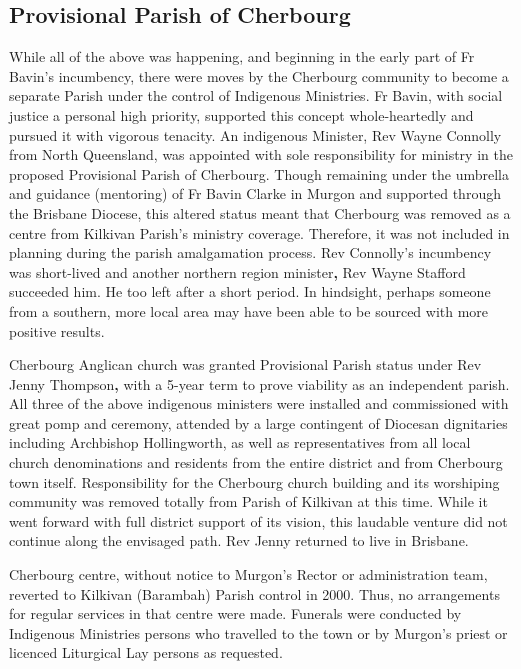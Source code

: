 \hypertarget{provisional-parish-of-cherbourg}{%
\subsection{Provisional Parish of Cherbourg}\label{provisional-parish-of-cherbourg}}

While all of the above was happening, and beginning in the early part of Fr Bavin's incumbency, there were moves by the Cherbourg community to become a separate Parish under the control of Indigenous Ministries. Fr Bavin, with social justice a personal high priority, supported this concept whole-heartedly and pursued it with vigorous tenacity. An indigenous Minister, Rev Wayne Connolly from North Queensland, was appointed with sole responsibility for ministry in the proposed Provisional Parish of Cherbourg. Though remaining under the umbrella and guidance (mentoring) of Fr Bavin Clarke in Murgon and supported through the Brisbane Diocese, this altered status meant that Cherbourg was removed as a centre from Kilkivan Parish's ministry coverage. Therefore, it was not included in planning during the parish amalgamation process. Rev Connolly's incumbency was short-lived and another northern region minister\textbf{,} Rev Wayne Stafford succeeded him. He too left after a short period. In hindsight, perhaps someone from a southern, more local area may have been able to be sourced with more positive results.

Cherbourg Anglican church was granted Provisional Parish status under Rev Jenny Thompson\textbf{,} with a 5-year term to prove viability as an independent parish. All three of the above indigenous ministers were installed and commissioned with great pomp and ceremony, attended by a large contingent of Diocesan dignitaries including Archbishop Hollingworth, as well as representatives from all local church denominations and residents from the entire district and from Cherbourg town itself. Responsibility for the Cherbourg church building and its worshiping community was removed totally from Parish of Kilkivan at this time. While it went forward with full district support of its vision, this laudable venture did not continue along the envisaged path. Rev Jenny returned to live in Brisbane.

Cherbourg centre, without notice to Murgon's Rector or administration team, reverted to Kilkivan (Barambah) Parish control in 2000. Thus, no arrangements for regular services in that centre were made. Funerals were conducted by Indigenous Ministries persons who travelled to the town or by Murgon's priest or licenced Liturgical Lay persons as requested.

